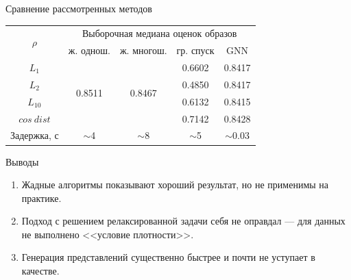 \documentclass[10pt]{beamer}
\begin{document}
\begin{frame}
	\begin{block}{Сравнение рассмотренных методов}
		\begin{center}
			\begin{tabular}{|c|cccc|}
				\hline
				\multirow{2}{*}{$\rho$} & \multicolumn{4}{c|}{Выборочная медиана оценок образов}                                                                       \\ \cline{2-5} 
				& \multicolumn{1}{c|}{ж. однош.}            & \multicolumn{1}{c|}{ж. многош.}           & \multicolumn{1}{c|}{гр. спуск} & GNN \\ \hline
				$L_1$                   & \multicolumn{1}{c|}{\multirow{4}{*}{0.8511}} & \multicolumn{1}{c|}{\multirow{4}{*}{0.8467}} & \multicolumn{1}{c|}{0.6602}         & 0.8417    \\ \cline{1-1} \cline{4-5} 
				$L_2$                   & \multicolumn{1}{c|}{}                     & \multicolumn{1}{c|}{}                     & \multicolumn{1}{c|}{0.4850}         & 0.8417  \\ \cline{1-1} \cline{4-5} 
				$L_{10}$                & \multicolumn{1}{c|}{}                     & \multicolumn{1}{c|}{}                     & \multicolumn{1}{c|}{0.6132}         &  0.8415  \\ \cline{1-1} \cline{4-5} 
				$cos~dist$              & \multicolumn{1}{c|}{}                     & \multicolumn{1}{c|}{}                     & \multicolumn{1}{c|}{0.7142}         &  0.8428  \\ \hline
				Задержка, с             & \multicolumn{1}{c|}{$\sim$4}                     & \multicolumn{1}{c|}{$\sim$8}                     & \multicolumn{1}{c|}{$\sim$5}          &   $\sim$0.03  \\ \hline
			\end{tabular}
		\end{center}
	
	\end{block}
	\begin{block}{Выводы}
		\begin{enumerate}
		\item Жадные алгоритмы показывают хороший результат, но не применимы на практике. 
		\item Подход с решением релаксированной задачи себя не оправдал --- для данных не выполнено <<условие плотности>>.\\
		\item Генерация представлений существенно быстрее и почти не уступает в качестве.
		\end{enumerate}
	\end{block}
\end{frame}
\end{document}
